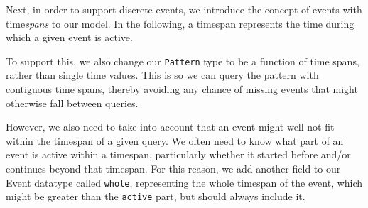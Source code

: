 Next, in order to support discrete events, we introduce the concept of
events with time\emph{spans} to our model. In the following, a timespan
represents the time during which a given event is active.

\begin{Shaded}
\begin{Highlighting}[]
  \OtherTok{=} \NormalTok{ \{} \NormalTok{,} \NormalTok{\}}
 \OtherTok{=} \NormalTok{ \{} \NormalTok{,}
\end{Highlighting}
\end{Shaded}

To support this, we also change our \texttt{Pattern} type to be a
function of time spans, rather than single time values. This is so we
can query the pattern with contiguous time spans, thereby avoiding any
chance of missing events that might otherwise fall between queries.

\begin{Shaded}
\begin{Highlighting}[]
 \OtherTok{=}  \OtherTok{{-}\textgreater{}}\NormalTok{ [}\NormalTok{ a]}
\end{Highlighting}
\end{Shaded}

However, we also need to take into account that an event might well not
fit within the timespan of a given query. We often need to know what
part of an event is active within a timespan, particularly whether it
started before and/or continues beyond that timespan. For this reason,
we add another field to our Event datatype called \texttt{whole},
representing the whole timespan of the event, which might be greater
than the \texttt{active} part, but should always include it.

\begin{Shaded}
\begin{Highlighting}[]
 \OtherTok{=} \NormalTok{ \{} \NormalTok{,} \NormalTok{,}
\end{Highlighting}
\end{Shaded}

